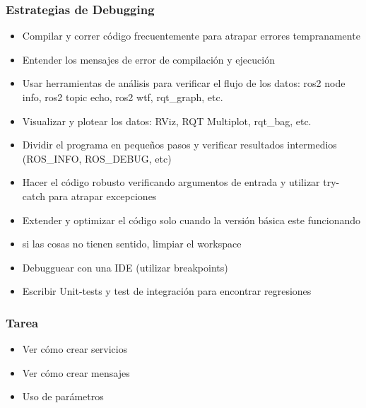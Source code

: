 \begin{frame}
    \frametitle{Estrategias de Debugging}
    
    \begin{itemize}
        \item Compilar y correr código frecuentemente para atrapar errores tempranamente
        \item Entender los mensajes de error de compilación y ejecución
        \item Usar herramientas de análisis para verificar el flujo de los datos: ros2 node info, ros2 topic echo, ros2 wtf, rqt\_graph, etc.
        \item Visualizar y plotear los datos: RViz, RQT Multiplot, rqt\_bag, etc.
        \item Dividir el programa en pequeños pasos y verificar resultados intermedios (ROS\_INFO, ROS\_DEBUG, etc)
        \item Hacer el código robusto verificando argumentos de entrada y utilizar try-catch para atrapar excepciones
        \item Extender y optimizar el código solo cuando la versión básica este funcionando
        \item si las cosas no tienen sentido, limpiar el workspace
        \item Debugguear con una IDE (utilizar breakpoints)
        \item Escribir Unit-tests y test de integración para encontrar regresiones
    \end{itemize}
    
\end{frame}

\begin{frame}
	\frametitle{Tarea}
	
	\begin{itemize}
		\item Ver cómo crear servicios
		\item Ver cómo crear mensajes
		\item Uso de parámetros
	\end{itemize}
	
\end{frame}


